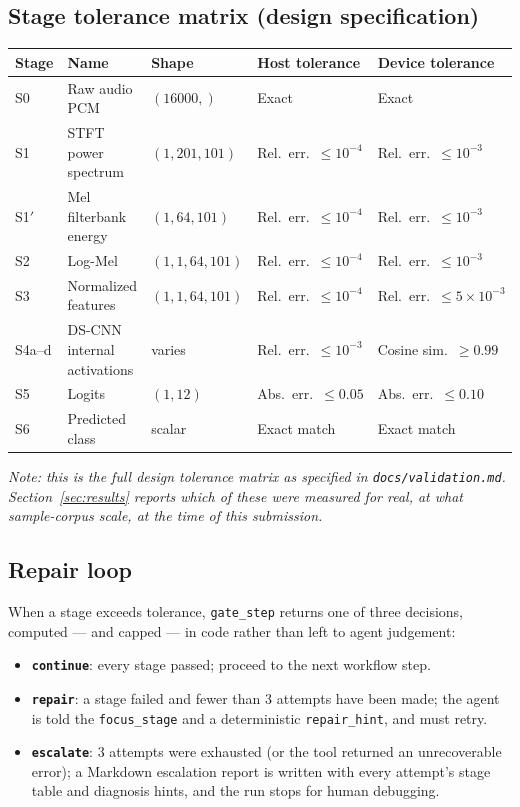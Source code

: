 \documentclass[11pt,a4paper]{article}
\begin{document}
\subsection{Stage tolerance matrix (design specification)}
\label{sec:tolerance}
\begin{longtable}{@{}p{1.0cm}p{3.3cm}p{2.5cm}p{2.9cm}p{2.9cm}@{}}
\toprule
\textbf{Stage} & \textbf{Name} & \textbf{Shape} & \textbf{Host tolerance} & \textbf{Device tolerance} \\
\midrule
\endhead
S0 & Raw audio PCM & $(16000,)$ & Exact & Exact \\
S1 & STFT power spectrum & $(1,201,101)$ & Rel.\ err.\ $\le 10^{-4}$ & Rel.\ err.\ $\le 10^{-3}$ \\
S1$'$ & Mel filterbank energy & $(1,64,101)$ & Rel.\ err.\ $\le 10^{-4}$ & Rel.\ err.\ $\le 10^{-3}$ \\
S2 & Log-Mel & $(1,1,64,101)$ & Rel.\ err.\ $\le 10^{-4}$ & Rel.\ err.\ $\le 10^{-3}$ \\
S3 & Normalized features & $(1,1,64,101)$ & Rel.\ err.\ $\le 10^{-4}$ & Rel.\ err.\ $\le 5\times10^{-3}$ \\
S4a--d & DS-CNN internal activations & varies & Rel.\ err.\ $\le 10^{-3}$ & Cosine sim.\ $\ge 0.99$ \\
S5 & Logits & $(1,12)$ & Abs.\ err.\ $\le 0.05$ & Abs.\ err.\ $\le 0.10$ \\
S6 & Predicted class & scalar & Exact match & Exact match \\
\bottomrule
\end{longtable}
\emph{Note: this is the full design tolerance matrix as specified in
\texttt{docs/validation.md}. Section~\ref{sec:results} reports which of
these were measured for real, at what sample-corpus scale, at the time of
this submission.}

\subsection{Repair loop}
When a stage exceeds tolerance, \texttt{gate\_step} returns one of three
decisions, computed --- and capped --- in code rather than left to agent
judgement:
\begin{itemize}[leftmargin=1.4em]
  \item \textbf{\texttt{continue}}: every stage passed; proceed to the next
  workflow step.
  \item \textbf{\texttt{repair}}: a stage failed and fewer than 3 attempts
  have been made; the agent is told the \texttt{focus\_stage} and a
  deterministic \texttt{repair\_hint}, and must retry.
  \item \textbf{\texttt{escalate}}: 3 attempts were exhausted (or the tool
  returned an unrecoverable error); a Markdown escalation report is written
  with every attempt's stage table and diagnosis hints, and the run stops
  for human debugging.
\end{itemize}
\end{document}
